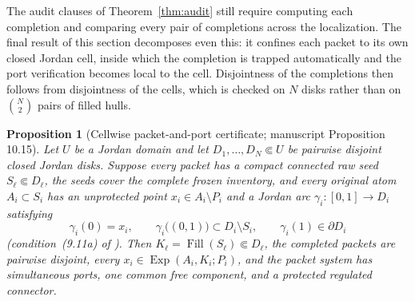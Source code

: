 \documentclass[11pt,reqno]{amsart}
\newtheorem{proposition}[theorem]{Proposition}
\theoremstyle{definition}
\theoremstyle{remark}
\newcommand{\Fill}{\operatorname{Fill}}
\newcommand{\Exp}{\operatorname{Exp}}
\begin{document}
The audit clauses of Theorem~\ref{thm:audit} still require computing each completion
and comparing every pair of completions across the localization. The final result of
this section decomposes even this: it confines each packet to its own closed Jordan
cell, inside which the completion is trapped automatically and the port verification
becomes local to the cell. Disjointness of the completions then follows from
disjointness of the cells, which is checked on $N$ disks rather than on
$\binom N2$ pairs of filled hulls.

\begin{proposition}[Cellwise packet-and-port certificate; manuscript Proposition
10.15]\label{prop:cellwise}
Let $U$ be a Jordan domain and let $D_1,\dots,D_N\Subset U$ be pairwise disjoint
closed Jordan disks. Suppose every packet has a compact connected raw seed
$S_\ell\Subset D_\ell$, the seeds cover the complete frozen inventory, and every
original atom $A_i\subset S_i$ has an unprotected point $x_i\in A_i\setminus P_i$
and a Jordan arc $\gamma_i\colon[0,1]\to D_i$ satisfying
\begin{equation}\label{eq:E-arc-condition}
\gamma_i(0)=x_i,
\qquad
\gamma_i\bigl((0,1)\bigr)\subset D_i\setminus S_i,
\qquad
\gamma_i(1)\in\partial D_i
\end{equation}
(condition~(9.11a) of \cite{MWman}). Then $K_\ell=\Fill(S_\ell)\Subset D_\ell$, the
completed packets are pairwise disjoint, every $x_i\in\Exp(A_i,K_i;P_i)$, and the
packet system has simultaneous ports, one common free component, and a protected
regulated connector.
\end{proposition}
\end{document}
